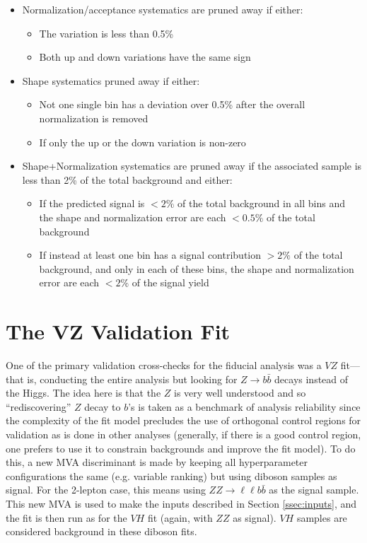 \begin{itemize}
\item Normalization/acceptance systematics are pruned away if either:
 \begin{itemize}
  \item The variation is less than 0.5\%
  \item Both up and down variations have the same sign
 \end{itemize}

\item Shape systematics pruned away if either:
 \begin{itemize}
  \item Not one single bin has a deviation over 0.5\% after the overall normalization is removed
  \item If only the up or the down variation is non-zero %
 \end{itemize}

\item Shape+Normalization systematics are pruned away if the associated sample is less than 2\% of the total background and either: 
 \begin{itemize}
  \item If the predicted signal is $<2\%$ of the total background in all bins and the shape and normalization error are each $<0.5\%$ of the total background
  \item If instead at least one bin has a signal contribution $>2\%$ of the total background, and only in each of these bins, the shape and normalization error are each $<2\%$ of the signal yield
 \end{itemize}
\end{itemize}


\section{The VZ Validation Fit}
One of the primary validation cross-checks for the fiducial analysis was a $VZ$ fit---that is, conducting the entire analysis but looking for $Z\to b\bar{b}$ decays instead of the Higgs.  The idea here is that the $Z$ is very well understood and so ``rediscovering'' $Z$ decay to $b$'s is taken as a benchmark of analysis reliability since the complexity of the fit model precludes the use of orthogonal control regions for validation as is done in other analyses (generally, if there is a good control region, one prefers to use it to constrain backgrounds and improve the fit model).  To do this, a new MVA discriminant is made by keeping all hyperparameter configurations the same (e.g. variable ranking) but using diboson samples as signal.  For the 2-lepton case, this means using $ZZ\to\ell\ell b\bar{b}$ as the signal sample.  This new MVA is used to make the inputs described in Section \ref{ssec:inputs}, and the fit is then run as for the $VH$ fit (again, with $ZZ$ as signal).  $VH$ samples are considered background in these diboson fits.

